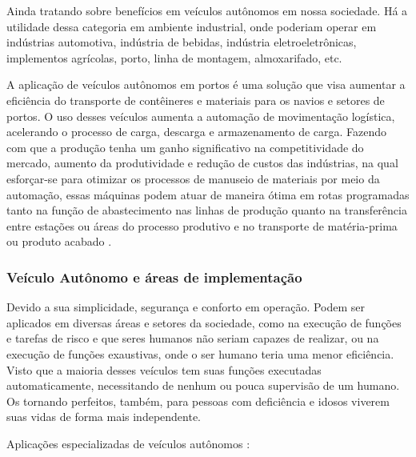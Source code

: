 
Ainda tratando sobre benefícios em veículos
autônomos em nossa sociedade.
Há a utilidade dessa categoria em ambiente industrial, onde poderiam  operar em indústrias automotiva, indústria de bebidas, indústria eletroeletrônicas, implementos agrícolas, porto, linha de montagem, almoxarifado, etc.

A aplicação de veículos autônomos em portos é uma solução que visa aumentar a eficiência do transporte de contêineres e materiais para os navios e setores de portos. O uso desses veículos aumenta a automação de movimentação logística, acelerando o processo de carga, descarga e armazenamento de carga. Fazendo com que a produção tenha um ganho significativo 
na competitividade do mercado, aumento da produtividade e redução de custos das indústrias, na qual esforçar-se para otimizar os processos de manuseio de materiais por meio da automação, essas máquinas podem atuar de maneira ótima em rotas programadas tanto na função de abastecimento nas linhas de produção quanto na transferência entre estações ou áreas do processo produtivo e no transporte de matéria-prima ou produto acabado \cite{aplicacao}.

\subsubsection{Veículo Autônomo e áreas de implementação} \label{implementacao}

Devido a sua simplicidade, segurança e conforto em operação. Podem ser aplicados em diversas áreas e setores da sociedade, como na execução de funções e tarefas de risco e que  seres humanos não seriam capazes de realizar, ou na execução de funções exaustivas, onde o ser humano teria uma menor eficiência. Visto que a maioria desses veículos  tem suas funções executadas automaticamente, necessitando de nenhum ou pouca supervisão de um humano. 
Os tornando perfeitos, também, para pessoas com deficiência e idosos viverem suas vidas de forma mais independente. 
\vspace {1cm}

Aplicações especializadas de veículos autônomos \cite{aplicacao2}:


